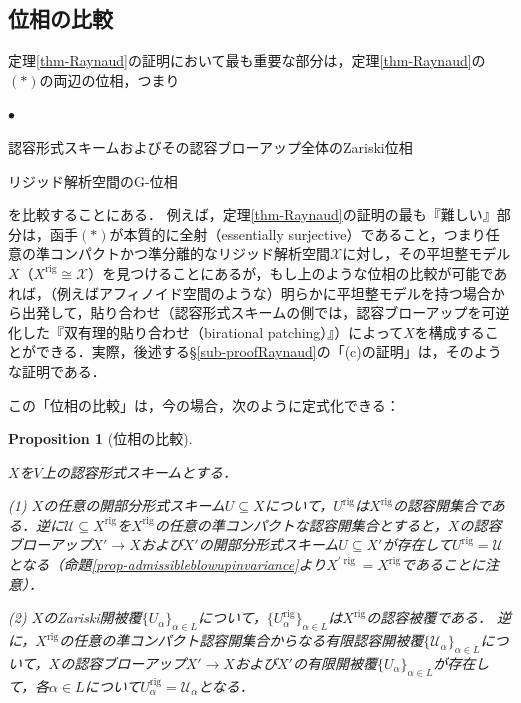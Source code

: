 \documentclass[a4paper,12pt, dvipdfmx]{jsbook}
\def\rig{\mathop{\mathrm{rig}}\nolimits}
\renewenvironment{itemize}%
{%
   \begin{list}{\parbox{1zw}{$\bullet$}}%
   {%
      \setlength{\topsep}{.5zh}
      \setlength{\itemindent}{0zw}
      \setlength{\leftmargin}{3zw}%
      \setlength{\rightmargin}{0zw}%
      \setlength{\labelsep}{.5zw}%
      \setlength{\labelwidth}{3zw}%
      \setlength{\itemsep}{0.2em}%
      \setlength{\parsep}{0em}%
      \setlength{\listparindent}{0zw}%
   }
}{%
   \end{list}%
}
\theoremstyle{plain}
\newtheorem{prop}[thm]{\bfseries Proposition}
\theoremstyle{definition}
\begin{document}
\subsection{位相の比較}\label{sub-comparisontopology}
定理\ref{thm-Raynaud}の証明において最も重要な部分は，定理\ref{thm-Raynaud}の$(\ast)$の両辺の位相，つまり
\begin{itemize}
\item 認容形式スキームおよびその認容ブローアップ全体のZariski位相
\item リジッド解析空間のG-位相
\end{itemize}
を比較することにある．
例えば，定理\ref{thm-Raynaud}の証明の最も『難しい』部分は，函手$(\ast)$が本質的に全射（essentially surjective）であること，つまり任意の準コンパクトかつ準分離的なリジッド解析空間$\mathcal{X}$に対し，その平坦整モデル$X$（$X^{\rig}\cong\mathcal{X}$）を見つけることにあるが，もし上のような位相の比較が可能であれば，（例えばアフィノイド空間のような）明らかに平坦整モデルを持つ場合から出発して，貼り合わせ（認容形式スキームの側では，認容ブローアップを可逆化した『双有理的貼り合わせ（birational patching）』）によって$X$を構成することができる．実際，後述する\S\ref{sub-proofRaynaud}の「(c)の証明」は，そのような証明である．

この「位相の比較」は，今の場合，次のように定式化できる：
\begin{prop}[{\rm 位相の比較}]\label{prop-comparisontopology}{\rm 
$X$を$V$上の認容形式スキームとする．

(1) $X$の任意の開部分形式スキーム$U\subseteq X$について，$U^{\rig}$は$X^{\rig}$の認容開集合である．逆に$\mathcal{U}\subseteq X^{\rig}$を$X^{\rig}$の任意の準コンパクトな認容開集合とすると，$X$の認容ブローアップ$X'\rightarrow X$および$X'$の開部分形式スキーム$U\subseteq X'$が存在して$U^{\rig}=\mathcal{U}$となる（命題\ref{prop-admissibleblowupinvariance}より$X^{\prime\rig}=X^{\rig}$であることに注意）．

(2) $X$のZariski開被覆$\{U_{\alpha}\}_{\alpha\in L}$について，$\{U^{\rig}_{\alpha}\}_{\alpha\in L}$は$X^{\rig}$の認容被覆である．
逆に，$X^{\rig}$の任意の準コンパクト認容開集合からなる有限認容開被覆$\{\mathcal{U}_{\alpha}\}_{\alpha\in L}$について，$X$の認容ブローアップ$X'\rightarrow X$および$X'$の有限開被覆$\{U_{\alpha}\}_{\alpha\in L}$が存在して，各$\alpha\in L$について$U^{\rig}_{\alpha}=\mathcal{U}_{\alpha}$となる．}
\end{prop}
\end{document}
